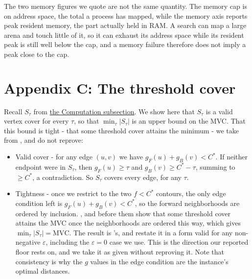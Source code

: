 \documentclass[letterpaper]{article} %
\begin{document}
The two memory figures we quote are not the same quantity. The memory cap is on address space, the total a process has mapped, while the memory axis reports peak resident memory, the part actually held in RAM. A search can map a large arena and touch little of it, so it can exhaust its address space while its resident peak is still well below the cap, and a memory failure therefore does not imply a peak close to the cap.

\section{Appendix C: The threshold cover}\label{app:c}
Recall $S_\tau$ from \hyperref[sec:computation]{the Computation subsection}. We show here that $S_\tau$ is a valid vertex cover for every $\tau$, so that $\min_\tau|S_\tau|$ is an upper bound on the MVC. That this bound is tight - that some threshold cover attains the minimum - we take from \citealt{shaham2018consistent}, and do not reprove:
\begin{itemize}
  \item Valid cover - for any edge $(u,v)$ we have $g_F(u)+g_B(v)<C^*$. If neither endpoint were in $S_\tau$, then $g_F(u)\ge\tau$ and $g_B(v)\ge C^*-\tau$, summing to $\ge C^*$, a contradiction. So $S_\tau$ covers every edge, for any $\tau$.
  \item Tightness - once we restrict to the two $f<C^*$ contours, the only edge condition left is $g_F(u)+g_B(v)<C^*$, so the forward neighborhoods are ordered by inclusion. \citet{shaham2018consistent}, and \citet{shaham2017minimal} before them show that some threshold cover attains the MVC once the neighborhoods are ordered this way, which gives $\min_\tau|S_\tau| = \text{MVC}$. The result is \citet{shaham2017minimal}'s, and \citet{shaham2018consistent} restate it in a form valid for any non-negative $\varepsilon$, including the $\varepsilon=0$ case we use. This is the direction our reported floor rests on, and we take it as given without reproving it. Note that consistency is why the $g$ values in the edge condition are the instance's optimal distances.
\end{itemize}
\end{document}
